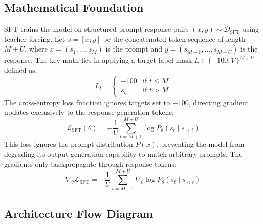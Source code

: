 \subsection{Mathematical Foundation}
SFT trains the model on structured prompt-response pairs $(x, y) \sim \mathcal{D}_{\text{SFT}}$ using teacher forcing. Let $s = [x ; y]$ be the concatenated token sequence of length $M + U$, where $x = (s_1, \ldots, s_M)$ is the prompt and $y = (s_{M+1}, \ldots, s_{M+U})$ is the response. The key math lies in applying a target label mask $L \in \{-100, \mathcal{V}\}^{M+U}$ defined as:
\begin{equation}
  L_t = \begin{cases} -100 & \text{if } t \le M \\ s_t & \text{if } t > M \end{cases}
\end{equation}
The cross-entropy loss function ignores targets set to $-100$, directing gradient updates exclusively to the response generation tokens:
\begin{equation}
  \mathcal{L}_{\text{SFT}}(\theta) = -\frac{1}{U} \sum_{t=M+1}^{M+U} \log P_\theta(s_t \mid s_{<t})
\end{equation}
This loss ignores the prompt distribution $P(x)$, preventing the model from degrading its output generation capability to match arbitrary prompts.
The gradients only backpropagate through response tokens:
\begin{equation}
  \nabla_\theta \mathcal{L}_{\text{SFT}} = -\frac{1}{U} \sum_{t=M+1}^{M+U} \nabla_\theta \log P_\theta(s_t \mid s_{<t})
\end{equation}

\subsection{Architecture Flow Diagram}

